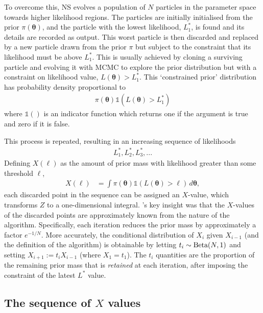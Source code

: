 \documentclass[entropy,article,accept,oneauthor,pdftex,10pt,a4paper]{mdpi}
\newcommand{\revision}{\color{darkblue}}
\newcommand{\x}{\boldsymbol{\theta}}
\begin{document}
To overcome this, NS evolves a population of $N$ particles in the parameter
space towards higher likelihood regions.
The particles are initially initialised from the prior $\pi(\x)$, and the
particle with the lowest likelihood, $L^*_1$, is found and its details are
recorded as output. This worst particle is then discarded
and replaced by a new particle
drawn from the prior $\pi$ but subject to the constraint that its likelihood
must be above $L^*_1$. {\revision This is usually achieved by cloning a surviving particle
and evolving it with MCMC to explore the prior distribution but with
a constraint on likelihood value, $L(\x) > L^*_1$. This `constrained prior'
distribution has probability density proportional to
\begin{align}
\pi(\x)\mathds{1}\left(L(\x) > L^*_1\right)
\end{align}
where $\mathds{1}()$ is an indicator function which returns one if the argument
is true and zero if it is false.}

This process is repeated, resulting in an
increasing sequence of likelihoods
\begin{align}
L^*_1, L^*_2, L^*_3,... \label{eqn:likelihood_sequence}
\end{align}
Defining $X(\ell)$ as the amount of prior mass with likelihood greater than
some threshold $\ell$,
\begin{align}
X(\ell) &= \int \pi(\x) \mathds{1}\left(L(\x) > \ell\right) \, d\x,
\end{align}
each discarded point in the sequence can be assigned an $X$-value,
which transforms $Z$ to a one-dimensional integral.
\citet{skilling2006nested}'s key insight was that the
$X$-values of the discarded points are approximately known from the nature of the
algorithm. Specifically, each iteration reduces the prior mass by approximately
a factor $e^{-1/N}$. More accurately, the conditional distribution of
$X_{i}$ given $X_{i-1}$ (and the definition of the algorithm)
is obtainable by letting
$t_i \sim \textnormal{Beta}(N,1)$ and setting $X_{i+1} := t_iX_{i-1}$ (where
$X_1 = t_1$).
The $t_i$ quantities are the proportion of the remaining prior mass
that is {\em retained} at each iteration, after imposing the constraint of the
latest $L^*$ value.

\subsection{The sequence of $X$ values}
\end{document}
